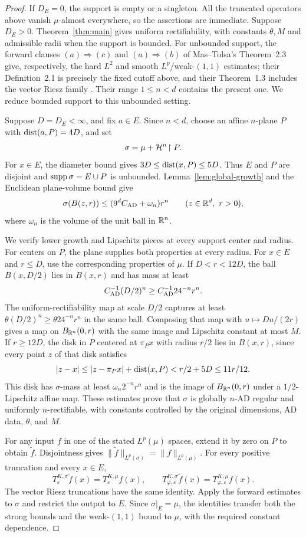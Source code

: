 \begin{proof}
If $D_E=0$, the support is empty or a singleton. All the truncated
operators above vanish $\mu$-almost everywhere, so the assertions are
immediate. Suppose $D_E>0$. Theorem~\ref{thm:main} gives uniform
rectifiability, with constants $\theta,M$ and admissible radii when the
support is bounded. For unbounded support, the forward clauses
$(a)\Rightarrow(c)$ and $(a)\Rightarrow(b)$ of
Mas--Tolsa's Theorem~2.3 give, respectively, the hard $L^2$ and smooth
$L^p$/weak-$(1,1)$ estimates; their Definition~2.1 is precisely the
fixed cutoff above, and their Theorem~1.3 includes the vector Riesz
family \cite{MasTolsa2014Variation}. Their range $1\le n<d$ contains
the present one. We reduce bounded support to this unbounded setting.

Suppose $D=D_E<\infty$, and fix $a\in E$. Since $n<d$, choose an
affine $n$-plane $P$ with $\operatorname{dist}(a,P)=4D$, and set
\[
 \sigma=\mu+\mathcal H^n\!\restriction P.
\]
For $x\in E$, the diameter bound gives
$3D\le\operatorname{dist}(x,P)\le5D$. Thus $E$ and $P$ are disjoint and
$\operatorname{supp}\sigma=E\cup P$ is unbounded. Lemma~\ref{lem:global-growth}
and the Euclidean plane-volume bound give
\[
 \sigma(B(z,r))\le(9^dC_{\rm AD}+\omega_n)r^n
 \qquad(z\in\mathbb R^d,\ r>0),
\]
where $\omega_n$ is the volume of the unit ball in $\mathbb R^n$.

We verify lower growth and Lipschitz pieces at every support center
and radius. For centers on $P$, the plane supplies both properties at
every radius. For $x\in E$ and $r\le D$, use the corresponding
properties of $\mu$. If $D<r<12D$, the ball $B(x,D/2)$ lies in
$B(x,r)$ and has mass at least
\[
 C_{\rm AD}^{-1}(D/2)^n\ge C_{\rm AD}^{-1}24^{-n}r^n.
\]
The uniform-rectifiability map at scale $D/2$ captures at least
$\theta(D/2)^n\ge\theta24^{-n}r^n$ in the same ball. Composing
that map with $u\mapsto Du/(2r)$ gives a map on $B_{\mathbb R^n}(0,r)$
with the same image and Lipschitz constant at most $M$.
If $r\ge12D$, the disk in $P$ centered at $\pi_Px$ with radius
$r/2$ lies in $B(x,r)$, since every point $z$ of that disk satisfies
\[
 |z-x|\le |z-\pi_Px|+\operatorname{dist}(x,P)
 <r/2+5D\le11r/12.
\]
This disk has $\sigma$-mass at least $\omega_n2^{-n}r^n$ and is
the image of $B_{\mathbb R^n}(0,r)$ under a $1/2$-Lipschitz affine map.
These estimates prove that $\sigma$ is globally $n$-AD regular and
uniformly $n$-rectifiable, with constants controlled by the original
dimensions, AD data, $\theta$, and $M$.

For any input $f$ in one of the stated $L^p(\mu)$ spaces, extend it
by zero on $P$ to obtain $\widetilde f$. Disjointness gives
$\|\widetilde f\|_{L^p(\sigma)}=\|f\|_{L^p(\mu)}$.
For every positive truncation and every $x\in E$,
\[
 T^{K,\sigma}_\varepsilon\widetilde f(x)
   =T^{K,\mu}_\varepsilon f(x),\qquad
 T^{K,\sigma}_{\varphi,\varepsilon}\widetilde f(x)
   =T^{K,\mu}_{\varphi,\varepsilon}f(x).
\]
The vector Riesz truncations have the same identity. Apply the forward
estimates to $\sigma$ and restrict the output to $E$. Since
$\sigma|_E=\mu$, the identities transfer both the strong bounds and
the weak-$(1,1)$ bound to $\mu$, with the required constant dependence.


\end{proof}
